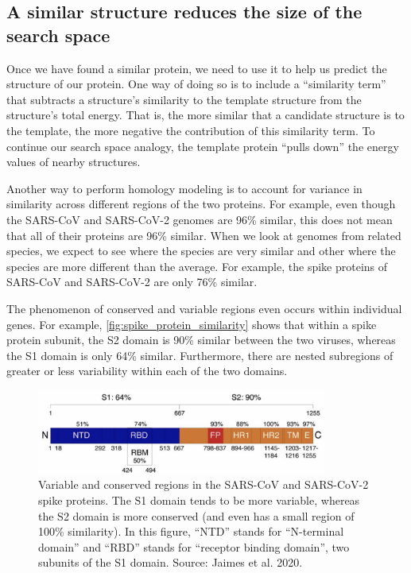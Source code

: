 \FloatBarrier
{}
\subsection{A similar structure reduces the size of the search space}

Once we have found a similar protein, we need to use it to help us predict the structure of our protein. One way of doing so is to include a ``similarity term'' that subtracts a structure's similarity to the template structure from the structure's total energy. That is, the more similar that a candidate structure is to the template, the more negative the contribution of this similarity term. To continue our search space analogy, the template protein ``pulls down'' the energy values of nearby structures.

Another way to perform homology modeling is to account for variance in similarity across different regions of the two proteins. For example, even though the SARS-CoV and SARS-CoV-2 genomes are 96\% similar, this does not mean that all of their proteins are 96\% similar. When we look at genomes from related species, we expect to see  where the species are very similar and other  where the species are more different than the average. For example, the spike proteins of SARS-CoV and SARS-CoV-2 are only 76\% similar.

The phenomenon of conserved and variable regions even occurs within individual genes. For example, \autoref{fig:spike_protein_similarity} shows that within a spike protein subunit, the S2 domain is 90\% similar between the two viruses, whereas the S1 domain is only 64\% similar. Furthermore, there are nested subregions of greater or less variability within each of the two domains.\\

\begin{figure}[h]
	\centering
	\mySfFamily
	\includegraphics[width = 0.85\textwidth]{../images/spike_protein_similarity.png}
	\caption{Variable and conserved regions in the SARS-CoV and SARS-CoV-2 spike proteins. The S1 domain tends to be more variable, whereas the S2 domain is more conserved (and even has a small region of 100\% similarity). In this figure, ``NTD'' stands for ``N-terminal domain'' and ``RBD'' stands for ``receptor binding domain'', two subunits of the S1 domain. Source: Jaimes et al. 2020.}
	\label{fig:spike_protein_similarity}
\end{figure}

